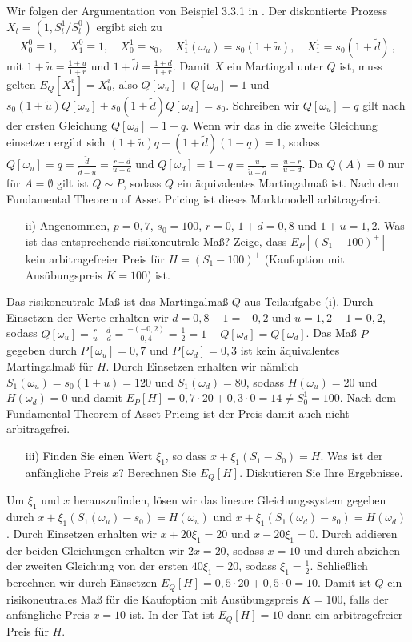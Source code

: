 \documentclass{article}
\begin{document}
Wir folgen der Argumentation von Beispiel 3.3.1 in \cite{Delbaen2006}.
Der dis\-kon\-tier\-te Prozess $X_t=(1,S^1_t/S^0_t)$ ergibt sich zu
\[
  X^0_0\equiv 1,\quad X^0_1\equiv 1,\quad X^1_0\equiv s_0,\quad X^1_1(\omega_u)=s_0(1+\tilde{u}),\quad X^1_1=s_0(1+\tilde{d})\,,
\]
mit $1+\tilde{u}=\frac{1+u}{1+r}$ und $1+\tilde{d}=\frac{1+d}{1+r}$.
Damit $X$ ein Martingal unter $Q$ ist, muss gelten $E_Q[X^i_1]=X^i_0$, also $Q[\omega_u]+Q[\omega_d]=1$ und $s_0(1+\tilde{u})Q[\omega_u]+s_0(1+\tilde{d})Q[\omega_d]=s_0$.
Schreiben wir $Q[\omega_u]=q$ gilt nach der ersten Gleichung $Q[\omega_d]=1-q$.
Wenn wir das in die zweite Gleichung einsetzen ergibt sich $(1+\tilde{u})q+(1+\tilde{d})(1-q)=1$, sodass $Q[\omega_u]=q=\frac{\tilde{d}}{\tilde{d}-u}=\frac{r-d}{u-d}$ und $Q[\omega_d]=1-q=\frac{\tilde{u}}{\tilde{u}-\tilde{d}}=\frac{u-r}{u-d}$.
Da $Q(A)=0$ nur für $A=\emptyset$ gilt ist $Q\sim P$, sodass $Q$ ein äquivalentes Martingalmaß ist.
Nach dem Fundamental Theorem of Asset Pricing ist dieses Marktmodell arbitragefrei.
\pagebreak
\begin{itemize}
\item [ii)] Angenommen, $p=0{,}7$, $s_0=100$, $r=0$, $1+d=0{,}8$ und $1+u=1{,}2$.
  Was ist das entsprechende risikoneutrale Maß?
  Zeige, dass $E_P[(S_1-100)^+]$ kein arbitragefreier Preis für $H=(S_1-100)^+$ (Kaufoption mit Ausübungspreis $K=100$) ist.
\end{itemize}
Das risikoneutrale Maß ist das Martingalmaß $Q$ aus Teilaufgabe (i).
Durch Einsetzen der Werte erhalten wir $d=0{,}8-1=-0{,}2$ und $u=1{,}2-1=0{,}2$, sodass $Q[\omega_u]=\frac{r-d}{u-d}=\frac{-(-0{,}2)}{0{,}4}=\frac{1}{2}=1-Q[\omega_d]=Q[\omega_d]$.
Das Maß $P$ gegeben durch $P[\omega_u]=0{,}7$ und $P[\omega_d]=0{,}3$ ist kein äquivalentes Martingalmaß für $H$.
Durch Einsetzen erhalten wir nämlich $S_1(\omega_u)=s_0(1+u)=120$ und $S_1(\omega_d)=80$, sodass $H(\omega_u)=20$ und $H(\omega_d)=0$ und damit $E_P[H]=0{,}7\cdot20+0{,}3\cdot0=14\neq S^1_0=100$.
Nach dem Fundamental Theorem of Asset Pricing ist der Preis damit auch nicht arbitragefrei.
\pagebreak
\begin{itemize}
\item [iii)] Finden Sie einen Wert $\xi_1$, so dass $x+\xi_1(S_1-S_0)=H$.
  Was ist der anfängliche Preis $x$?
  Berechnen Sie $E_Q[H]$.
  Diskutieren Sie Ihre Ergebnisse.
\end{itemize}
Um $\xi_1$ und $x$ herauszufinden, lösen wir das lineare Gleichungssystem gegeben durch $x+\xi_1(S_1(\omega_u)-s_0)=H(\omega_u)$ und $x+\xi_1(S_1(\omega_d)-s_0)=H(\omega_d)$.
Durch Einsetzen erhalten wir $x+20\xi_1=20$ und $x-20\xi_1=0$.
Durch addieren der beiden Gleichungen erhalten wir $2x=20$, sodass $x=10$ und durch abziehen der zweiten Gleichung von der ersten $40\xi_1=20$, sodass $\xi_1=\frac{1}{2}$.
Schließlich berechnen wir durch Einsetzen $E_Q[H]=0{,}5\cdot20+0{,}5\cdot0=10$.
Damit ist $Q$ ein risikoneutrales Maß für die Kaufoption mit Ausübungspreis $K=100$, falls der anfängliche Preis $x=10$ ist.
In der Tat ist $E_Q[H]=10$ dann ein arbitragefreier Preis für $H$.

\end{document}
